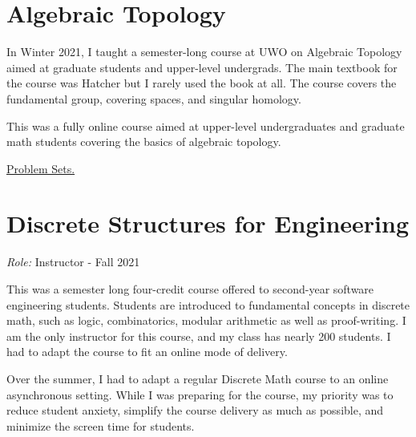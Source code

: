 \documentclass[
]{report}
\begin{document}
\hypertarget{algebraic-topology}{%
\section{Algebraic Topology}\label{algebraic-topology}}

In Winter 2021, I taught a semester-long course at UWO on Algebraic Topology aimed at graduate students and upper-level undergrads. The main textbook for the course was Hatcher but I rarely used the book at all. The course covers the fundamental group, covering spaces, and singular homology.

This was a fully online course aimed at upper-level undergraduates and graduate math students covering the basics of algebraic topology.

\href{https://github.com/apurvnakade/uwo2021-algebraic-topology/tree/main/output}{Problem Sets.}

\hypertarget{discrete-structures-for-engineering}{%
\section{Discrete Structures for Engineering}\label{discrete-structures-for-engineering}}

\emph{Role:} Instructor - Fall 2021

This was a semester long four-credit course offered to second-year software engineering students. Students are introduced to fundamental concepts in discrete math, such as logic, combinatorics, modular arithmetic as well as proof-writing. I am the only instructor for this course, and
my class has nearly 200 students. I had to adapt the course to fit an online mode of delivery.

Over the summer, I had to adapt a regular Discrete Math course to an online asynchronous setting. While I was preparing for the course, my priority was to reduce student anxiety, simplify the course delivery as much as possible, and minimize the screen time for students.
\end{document}
